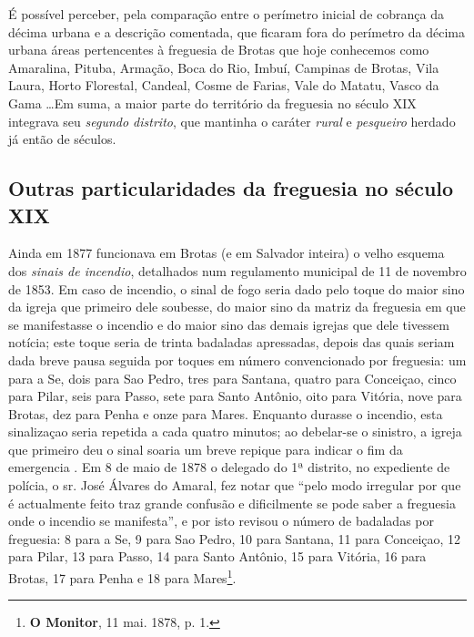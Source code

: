 \begin{enumerate}
\end{enumerate}

É possível perceber, pela comparação entre o perímetro inicial de cobrança da décima urbana e a descrição comentada, que ficaram fora do perímetro da décima urbana áreas pertencentes à freguesia de Brotas que hoje conhecemos como Amaralina, Pituba, Armação, Boca do Rio, Imbuí, Campinas de Brotas, Vila Laura, Horto Florestal, Candeal, Cosme de Farias, Vale do Matatu, Vasco da Gama \dots Em suma, a maior parte do território da freguesia no século XIX integrava seu \textit{segundo distrito}, que mantinha o caráter \textit{rural} e \textit{pesqueiro} herdado já então de séculos.

\subsection{Outras particularidades da freguesia no século XIX}

Ainda em 1877 funcionava em Brotas (e em Salvador inteira) o velho esquema dos \textit{sinais de incendio}, detalhados num regulamento municipal de 11 de novembro de 1853. Em caso de incendio, o sinal de fogo seria dado pelo toque do maior sino da igreja que primeiro dele soubesse, do maior sino da matriz da freguesia em que se manifestasse o incendio e do maior sino das demais igrejas que dele tivessem notícia; este toque seria de trinta badaladas apressadas, depois das quais seriam dada breve pausa seguida por toques em número convencionado por freguesia: um para a Se, dois para Sao Pedro, tres para Santana, quatro para Conceiçao, cinco para Pilar, seis para Passo, sete para Santo Antônio, oito para Vitória, nove para Brotas, dez para Penha e onze para Mares. Enquanto durasse o incendio, esta sinalizaçao seria repetida a cada quatro minutos; ao debelar-se o sinistro, a igreja que primeiro deu o sinal soaria um breve repique para indicar o fim da emergencia \cite[pp.~192-193]{macosta_almana_1877}. Em 8 de maio de 1878 o delegado do 1ª distrito, no expediente de polícia, o sr. José Álvares do Amaral, fez notar que ``pelo modo irregular por que é actualmente feito traz grande confusão e dificilmente se pode saber a freguesia onde o incendio se manifesta'', e por isto revisou o número de badaladas por freguesia: 8 para a Se, 9 para Sao Pedro, 10 para Santana, 11 para Conceiçao, 12 para Pilar, 13 para Passo, 14 para Santo Antônio, 15 para Vitória, 16 para Brotas, 17 para Penha e 18 para Mares\footnote{\textbf{O Monitor}, 11 mai. 1878, p. 1.}.

